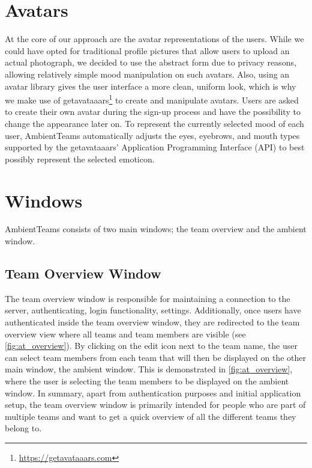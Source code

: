 \section{Avatars}
At the core of our approach are the avatar representations of the users. While we could have opted for traditional profile pictures that allow users to upload an actual photograph, we decided to use the abstract form due to privacy reasons, allowing relatively simple mood manipulation on such avatars. Also, using an avatar library gives the user interface a more clean, uniform look, which is why we make use of getavataaars\footnote{\url{https://getavataaars.com}} to create and manipulate avatars. Users are asked to create their own avatar during the sign-up process and have the possibility to change the appearance later on. To represent the currently selected mood of each user, AmbientTeams automatically adjusts the eyes, eyebrows, and mouth types supported by the getavataaars' Application Programming Interface (API) to best possibly represent the selected emoticon.

\section{Windows}
AmbientTeams consists of two main windows; the team overview and the ambient window.

\subsection{Team Overview Window}
The team overview window is responsible for maintaining a connection to the server, authenticating, login functionality, settings. Additionally, once users have authenticated inside the team overview window, they are redirected to the team overview view where all teams and team members are visible (see \autoref{fig:at_overview}). By clicking on the edit icon next to the team name, the user can select team members from each team that will then be displayed on the other main window, the ambient window. This is demonstrated in \autoref{fig:at_overview}, where the user is selecting the team members to be displayed on the ambient window. In summary, apart from authentication purposes and initial application setup, the team overview window is primarily intended for people who are part of multiple teams and want to get a quick overview of all the different teams they belong to.

